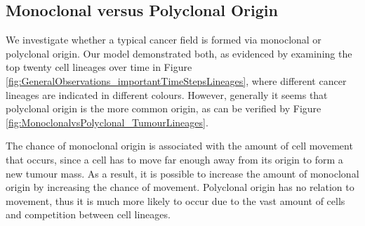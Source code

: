 \documentclass[\main/thesis.tex]{subfiles}
\begin{document}
\subsection{Monoclonal versus Polyclonal Origin}
We investigate whether a typical cancer field is formed via monoclonal or polyclonal origin. Our model demonstrated both, as evidenced by examining the top twenty cell lineages over time in Figure \ref{fig:GeneralObservations_importantTimeStepsLineages}, where different cancer lineages are indicated in different colours. However, generally it seems that polyclonal origin is the more common origin, as can be verified by Figure \ref{fig:MonoclonalvsPolyclonal_TumourLineages}.

The chance of monoclonal origin is associated with the amount of cell movement that occurs, since a cell has to move far enough away from its origin to form a new tumour mass. As a result, it is possible to increase the amount of monoclonal origin by increasing the chance of movement. Polyclonal origin has no relation to movement, thus it is much more likely to occur due to the vast amount of cells and competition between cell lineages. 
\end{document}
